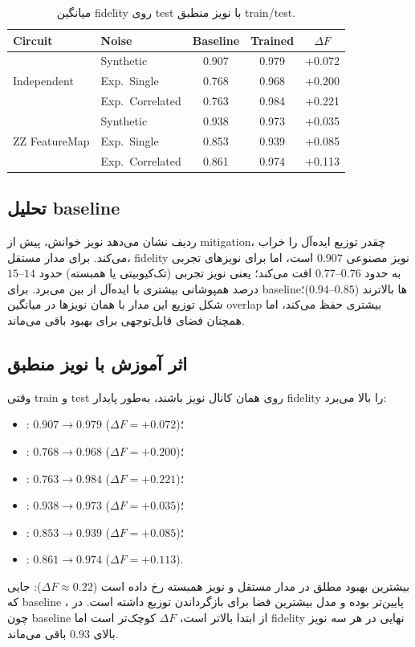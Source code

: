 \begin{table}[htbp]
\centering
\caption{میانگین fidelity روی test با نویز منطبق train/test.}
\label{tab:main-fidelity}
\begin{tabular}{llccc}
\toprule
Circuit & Noise & Baseline & Trained & $\Delta F$\\
\midrule
\multirow{3}{*}{Independent}
& Synthetic & 0.907 & 0.979 & +0.072\\
& Exp.\ Single & 0.768 & 0.968 & +0.200\\
& Exp.\ Correlated & 0.763 & 0.984 & +0.221\\
\midrule
\multirow{3}{*}{ZZ FeatureMap}
& Synthetic & 0.938 & 0.973 & +0.035\\
& Exp.\ Single & 0.853 & 0.939 & +0.085\\
& Exp.\ Correlated & 0.861 & 0.974 & +0.113\\
\bottomrule
\end{tabular}
\end{table}

\subsection{تحلیل baseline}

ردیف  نشان می‌دهد نویز خوانش، پیش از mitigation، چقدر توزیع ایده‌آل را خراب می‌کند. برای مدار مستقل، fidelity نویز مصنوعی $0.907$ است، اما برای نویزهای تجربی به حدود $0.76$--$0.77$ افت می‌کند؛ یعنی نویز تجربی (تک‌کیوبیتی یا همبسته) حدود $14$--$15$ درصد همپوشانی بیشتری با ایده‌آل از بین می‌برد. برای  baselineها بالاترند ($0.85$--$0.94$)؛ شکل توزیع این مدار با همان نویزها در میانگین overlap بیشتری حفظ می‌کند، اما همچنان فضای قابل‌توجهی برای بهبود باقی می‌ماند.

\subsection{اثر آموزش با نویز منطبق}

وقتی train و test روی همان کانال نویز باشند،  به‌طور پایدار fidelity را بالا می‌برد:
\begin{itemize}
	\item {}: $0.907 \rightarrow 0.979$ ($\Delta F = +0.072$)؛
	\item {}: $0.768 \rightarrow 0.968$ ($\Delta F = +0.200$)؛
	\item {}: $0.763 \rightarrow 0.984$ ($\Delta F = +0.221$)؛
	\item {}: $0.938 \rightarrow 0.973$ ($\Delta F = +0.035$)؛
	\item {}: $0.853 \rightarrow 0.939$ ($\Delta F = +0.085$)؛
	\item {}: $0.861 \rightarrow 0.974$ ($\Delta F = +0.113$).
\end{itemize}
بیشترین بهبود مطلق در مدار مستقل و نویز همبسته رخ داده است ($\Delta F \approx 0.22$): جایی که baseline پایین‌تر بوده و مدل بیشترین فضا برای بازگرداندن توزیع داشته است. در ، چون baseline از ابتدا بالاتر است، $\Delta F$ کوچک‌تر است اما fidelity نهایی در هر سه نویز بالای $0.93$ باقی می‌ماند.

